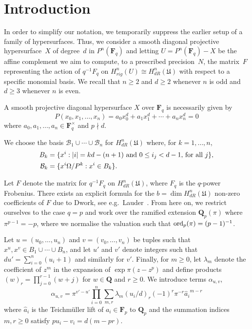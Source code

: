 
\section{Introduction}

In order to simplify our notation, we temporarily suppress the earlier 
setup of a family of hypersurfaces.
Thus, we consider a smooth diagonal projective hypersurface~$X$ of degree~$d$ 
in $P^n(\mathbf{F}_q)$ and letting $U = P^n(\mathbf{F}_q) - X$ be the affine 
complement we aim to compute, to a prescribed precision~$N$, the matrix~$F$ 
representing the action of $q^{-1} F_q$ on 
$H_{rig}^n(U) \cong H_{dR}^n(\mathfrak{U})$ with respect to a specific 
monomial basis.  We recall that $n \geq 2$ and $d \geq 2$ whenever $n$ is odd 
and $d \geq 3$ whenever $n$ is even.

A smooth projective diagonal hypersurface $X$ over $\mathbf{F}_q$ 
is necessarily given by 
\begin{equation*}
P(x_0, x_1, \dotsc, x_n) = a_0 x_0^d + a_1 x_1^d + \dotsb + a_n x_n^d = 0
\end{equation*}
where $a_0, a_1, \dotsc, a_n \in \mathbf{F}_q^{\times}$ and $p \nmid d$.

We choose the basis $\mathcal{B}_1 \cup \dotsb \cup \mathcal{B}_n$ 
for $H_{dR}^n(\mathfrak{U})$ where, for $k = 1, \dotsc, n$, 
\begin{align*}
B_k & = \{ x^i : \text{$\lvert i\rvert = kd - (n+1)$ and $0 \leq i_j < d-1$, for all $j$} \}, \\
\mathcal{B}_k & = \{x^i \Omega / P^k : x^i \in B_k \}.
\end{align*}

Let $F$ denote the matrix for $q^{-1} F_q$ on $H_{dR}^n(\mathfrak{U})$, 
where $F_q$ is the $q$-power Frobenius.  There exists an explicit formula 
for the $b = \dim H_{dR}^n(\mathfrak{U})$ non-zero coefficients of $F$ 
due to Dwork, see e.g.\ Lauder~\citep[Section~6.1]{Lau04}.
From here on, we restrict ourselves to the case $q = p$ and work over 
the ramified extension $\mathbf{Q}_p(\pi)$ where $\pi^{p-1} = -p$, 
where we normalise the valuation such that $\operatorname{ord}_p(\pi) = (p-1)^{-1}$.

Let $u = (u_0, \dotsc, u_n)$ and $v = (v_0, \dotsc, v_n)$ be tuples such 
that $x^u, x^v \in B_1 \cup \dotsb \cup B_n$,  and let $u'$ and $v'$ 
denote integers such that $d u' = \sum_{i=0}^n (u_i + 1)$ and similarly 
for $v'$.  Finally, for $m \geq 0$, let $\lambda_m$ denote the coefficient 
of $z^m$ in the expansion of $\exp \pi (z - z^p)$ and define products 
$(w)_r = \prod_{j=0}^{r-1} (w + j)$ for $w \in \mathbf{Q}$ and $r \geq 0$. 
We introduce terms $\alpha_{u,v}$, 
\begin{equation*}
\alpha_{u,v} = \pi^{v' - u'} \prod_{i = 0}^n \sum_{m, r} \lambda_m (u_i / d)_r (-1)^r \pi^{-r} {\hat{a}_i}^{m-r}
\end{equation*}
where $\hat{a}_i$ is the Teichm\"uller lift of $a_i \in \mathbf{F}_p$ 
to $\mathbf{Q}_p$ and the summation indices $m, r \geq 0$ satisfy 
$p u_i - v_i = d (m - pr)$.

